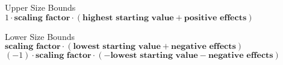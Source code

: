 \begin{block}{Upper Size Bounds}
  $1 \cdot \textbf{scaling factor} \cdot (\textbf{highest starting value} + \textbf{positive effects})$ \\
\end{block}
\begin{block}{Lower Size Bounds}
  $\textbf{scaling factor} \cdot (\textbf{lowest starting value} + \textbf{negative effects})$ \\
  $(-1) \cdot \textbf{scaling factor} \cdot (-\textbf{lowest starting value} - \textbf{negative effects})$
\end{block}
